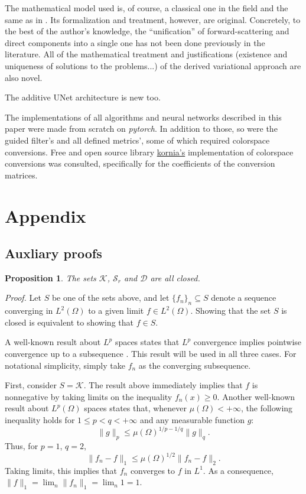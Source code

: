 \documentclass[twocolumn,twoside,a4paper,10pt]{IEEEtran}
\newtheorem{proposition}{Proposition}
\begin{document}
The mathematical model used is, of course, a classical one in the field and the same as in \cite{xie2021variational}. Its formalization and treatment, however, are original. Concretely, to the best of the author's knowledge, the ``unification'' of forward-scattering and direct components into a single one has
not been done previously in the literature. All of the mathematical treatment
and justifications (existence and uniqueness of solutions to the problems...) of
the derived variational approach are also novel.

The additive UNet architecture is new too.

The implementations of all algorithms and neural networks described in this
paper were made from scratch on \textit{pytorch}. In
addition to those, so were the guided filter's and all defined metrics', some of which required colorspace conversions. Free and open
source library \href{https://github.com/kornia/kornia}{kornia's} implementation
of colorspace conversions was consulted, specifically for the coefficients of
the conversion matrices.

\section{Appendix}
\subsection{Auxliary proofs}
\begin{proposition}\label{prop:closed-sets}
  The sets \(\mathcal{K}\), \(\mathcal{S}_r\) and \(\mathcal{D}\) are all closed.
\end{proposition}
\textit{Proof.}
Let \(S\) be one of the sets above, and let \(\{f_n\}_n\subseteq S\) denote a sequence converging in \(L^2(\Omega)\) to a given limit \(f\in L^2(\Omega)\). Showing that the set \(S\) is closed is equivalent to showing that \(f\in S\).

A well-known result about \(L^p\) spaces states that \(L^p\) convergence implies pointwise convergence up to a subsequence \cite{ash1972real}. This result will be used in all three cases. For notational simplicity, simply take \(f_n\) as the converging subsequence.

First, consider \(S=\mathcal{K}\). The result above immediately implies that \(f\) is nonnegative by taking limits on the inequality \(f_n(x) \geq 0\). Another well-known result about \(L^p(\Omega)\) spaces states that, whenever \(\mu(\Omega)<+\infty\), the following inequality holds for \(1\leq p < q < +\infty\) and any measurable function \(g\):
\[
  \|g\|_p \leq \mu(\Omega)^{1/p - 1/q} \|g\|_q
.\]
Thus, for \(p=1\), \(q=2\),
\[
  \|f_n-f\|_1 \leq \mu(\Omega)^{1/2}\|f_n - f\|_2
.\]
Taking limits, this implies that \(f_n\) converges to \(f\) in \(L^1\). As a consequence, \(\|f\|_{1}=\lim_n \|f_n\|_{1}=\lim_n 1 = 1\).
\end{document}
